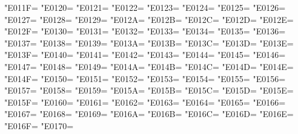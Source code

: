 \XeTeXcharclass"E011F=\KclassCM
\XeTeXcharclass"E0120=\KclassCM
\XeTeXcharclass"E0121=\KclassCM
\XeTeXcharclass"E0122=\KclassCM
\XeTeXcharclass"E0123=\KclassCM
\XeTeXcharclass"E0124=\KclassCM
\XeTeXcharclass"E0125=\KclassCM
\XeTeXcharclass"E0126=\KclassCM
\XeTeXcharclass"E0127=\KclassCM
\XeTeXcharclass"E0128=\KclassCM
\XeTeXcharclass"E0129=\KclassCM
\XeTeXcharclass"E012A=\KclassCM
\XeTeXcharclass"E012B=\KclassCM
\XeTeXcharclass"E012C=\KclassCM
\XeTeXcharclass"E012D=\KclassCM
\XeTeXcharclass"E012E=\KclassCM
\XeTeXcharclass"E012F=\KclassCM
\XeTeXcharclass"E0130=\KclassCM
\XeTeXcharclass"E0131=\KclassCM
\XeTeXcharclass"E0132=\KclassCM
\XeTeXcharclass"E0133=\KclassCM
\XeTeXcharclass"E0134=\KclassCM
\XeTeXcharclass"E0135=\KclassCM
\XeTeXcharclass"E0136=\KclassCM
\XeTeXcharclass"E0137=\KclassCM
\XeTeXcharclass"E0138=\KclassCM
\XeTeXcharclass"E0139=\KclassCM
\XeTeXcharclass"E013A=\KclassCM
\XeTeXcharclass"E013B=\KclassCM
\XeTeXcharclass"E013C=\KclassCM
\XeTeXcharclass"E013D=\KclassCM
\XeTeXcharclass"E013E=\KclassCM
\XeTeXcharclass"E013F=\KclassCM
\XeTeXcharclass"E0140=\KclassCM
\XeTeXcharclass"E0141=\KclassCM
\XeTeXcharclass"E0142=\KclassCM
\XeTeXcharclass"E0143=\KclassCM
\XeTeXcharclass"E0144=\KclassCM
\XeTeXcharclass"E0145=\KclassCM
\XeTeXcharclass"E0146=\KclassCM
\XeTeXcharclass"E0147=\KclassCM
\XeTeXcharclass"E0148=\KclassCM
\XeTeXcharclass"E0149=\KclassCM
\XeTeXcharclass"E014A=\KclassCM
\XeTeXcharclass"E014B=\KclassCM
\XeTeXcharclass"E014C=\KclassCM
\XeTeXcharclass"E014D=\KclassCM
\XeTeXcharclass"E014E=\KclassCM
\XeTeXcharclass"E014F=\KclassCM
\XeTeXcharclass"E0150=\KclassCM
\XeTeXcharclass"E0151=\KclassCM
\XeTeXcharclass"E0152=\KclassCM
\XeTeXcharclass"E0153=\KclassCM
\XeTeXcharclass"E0154=\KclassCM
\XeTeXcharclass"E0155=\KclassCM
\XeTeXcharclass"E0156=\KclassCM
\XeTeXcharclass"E0157=\KclassCM
\XeTeXcharclass"E0158=\KclassCM
\XeTeXcharclass"E0159=\KclassCM
\XeTeXcharclass"E015A=\KclassCM
\XeTeXcharclass"E015B=\KclassCM
\XeTeXcharclass"E015C=\KclassCM
\XeTeXcharclass"E015D=\KclassCM
\XeTeXcharclass"E015E=\KclassCM
\XeTeXcharclass"E015F=\KclassCM
\XeTeXcharclass"E0160=\KclassCM
\XeTeXcharclass"E0161=\KclassCM
\XeTeXcharclass"E0162=\KclassCM
\XeTeXcharclass"E0163=\KclassCM
\XeTeXcharclass"E0164=\KclassCM
\XeTeXcharclass"E0165=\KclassCM
\XeTeXcharclass"E0166=\KclassCM
\XeTeXcharclass"E0167=\KclassCM
\XeTeXcharclass"E0168=\KclassCM
\XeTeXcharclass"E0169=\KclassCM
\XeTeXcharclass"E016A=\KclassCM
\XeTeXcharclass"E016B=\KclassCM
\XeTeXcharclass"E016C=\KclassCM
\XeTeXcharclass"E016D=\KclassCM
\XeTeXcharclass"E016E=\KclassCM
\XeTeXcharclass"E016F=\KclassCM
\XeTeXcharclass"E0170=\KclassCM
